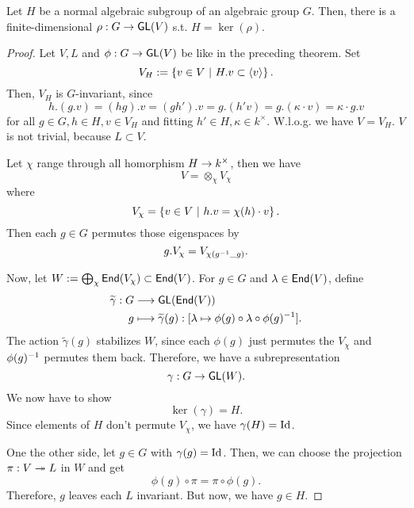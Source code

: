 \begin{theorem}
	Let $H$ be a normal algebraic subgroup of an algebraic group $G$. Then, there is a finite-dimensional $\rho : G \overset{}{\rightarrow} \textsf{GL}(V)$ s.t. $H = \ker(\rho)$.
\end{theorem}
\begin{proof}
	Let $V,L$ and $\phi : G \overset{}{\rightarrow} \textsf{GL}(V)$ be like in the preceding theorem. Set
	\[ V_H := \left\lbrace v \in V ~ | ~ H.v \subset \left<v\right>\right\rbrace. \]
	Then, $V_H$ is $G$-invariant, since
	\[ h.(g.v) = (hg).v = (gh').v = g. (h'v) = g.(\kappa \cdot v) = \kappa \cdot g.v \]
	for all $g \in G, h \in H, v\in V_H$ and fitting $h' \in H, \kappa \in k^\times$. W.l.o.g. we have $V = V_H$. $V$ is not trivial, because $L\subset V$.
	
	 Let $\chi$ range through all homorphism $H \overset{}{\rightarrow} k^\times$, then we have
	\[ V = \otimes_\chi V_\chi \]
	where
	\[ V_\chi = \left\lbrace v \in V ~ | ~ h.v = \chi(h) \cdot v\right\rbrace. \]
	Then each $g\in G$ permutes those eigenspaces by
	\[ g.V_\chi = V_{\chi(g^{-1} \_ g)}. \]
	
	Now, let $ W:= \bigoplus_{\chi }\textsf{End} (V_\chi) \subset \textsf{End}(V)$. For $g \in G$ and $\lambda \in \textsf{End}(V)$, define
	\begin{align*}
	\widetilde{\gamma} : G  &\overset{}{\longrightarrow} \textsf{GL}(\textsf{End}(V))\\
	g &\longmapsto \widetilde{\gamma}(g) : [\lambda \mapsto \phi(g) \circ \lambda \circ \phi(g)^{-1}].
	\end{align*}
	The action $\widetilde{\gamma}(g)$ stabilizes $W$, since each $\phi(g)$ just permutes the $V_\chi$ and $\phi(g)^{-1}$ permutes them back. Therefore, we have a subrepresentation
	\[ \gamma : G \overset{}{\rightarrow} \textsf{GL}(W). \]
	We now have to show
	\[ \ker(\gamma) = H. \]
	Since elements of $H$ don't permute $V_\chi$, we have $\gamma(H) = \text{Id}_{}$.
	
	One the other side, let $g \in G$ with $\gamma(g) = \text{Id}_{}$. Then, we can choose the projection $\pi : V \overset{}{\twoheadrightarrow} L$ in $W$ and get
	\[ \phi(g) \circ \pi = \pi \circ \phi(g). \]
	Therefore, $g$ leaves each $L$ invariant. But now, we have $g \in H$. 
\end{proof}
